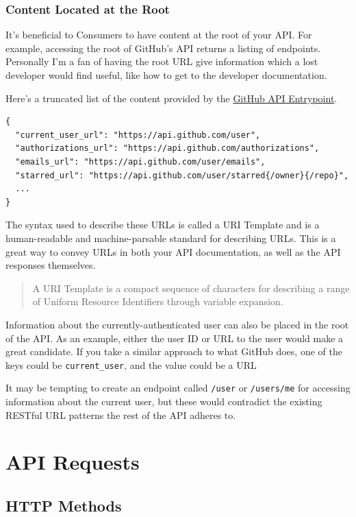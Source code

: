\documentclass{book}
\begin{document}
\subsection{Content Located at the Root}

It's beneficial to Consumers to have content at the root of your API. For example, accessing the root of GitHub's API returns a listing of endpoints. Personally I'm a fan of having the root URL give information which a lost developer would find useful, like how to get to the developer documentation.

Here's a truncated list of the content provided by the \href{https://api.github.com/}{GitHub API Entrypoint}.

\begin{verbatim}
{
  "current_user_url": "https://api.github.com/user",
  "authorizations_url": "https://api.github.com/authorizations",
  "emails_url": "https://api.github.com/user/emails",
  "starred_url": "https://api.github.com/user/starred{/owner}{/repo}",
  ...
}
\end{verbatim}

The syntax used to describe these URLs is called a URI Template and is a human-readable and machine-parsable standard for describing URLs. This is a great way to convey URLs in both your API documentation, as well as the API responses themselves.

\begin{quote}
A URI Template is a compact sequence of characters for describing a range of Uniform Resource Identifiers through variable expansion. \cite{RFC6570}
\end{quote}

Information about the currently-authenticated user can also be placed in the root of the API. As an example, either the user ID or URL to the user would make a great candidate. If you take a similar approach to what GitHub does, one of the keys could be \texttt{current\_user}, and the value could be a URL

It may be tempting to create an endpoint called \texttt{/user} or \texttt{/users/me} for accessing information about the current user, but these would contradict the existing RESTful URL patterns the rest of the API adheres to.


\chapter{API Requests}

\section{HTTP Methods}
\end{document}
